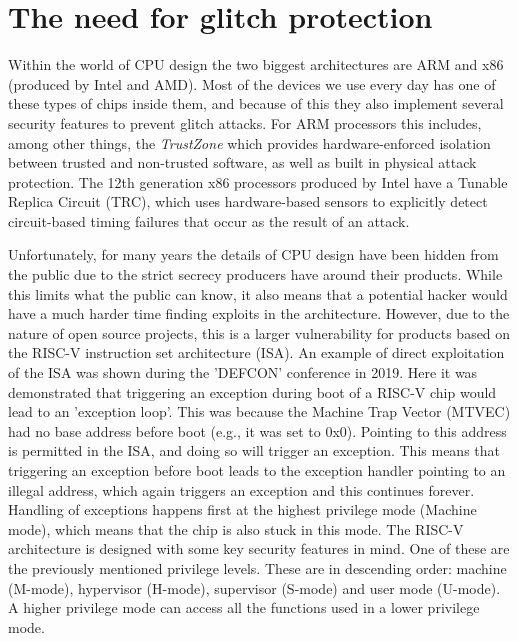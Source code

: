 
\section{The need for glitch protection}

Within the world of CPU design the two biggest architectures are ARM and x86 (produced by Intel and AMD). Most of the devices we use every day has one of these types of chips inside them, and because of this they also implement several security features to prevent glitch attacks. For ARM processors this includes, among other things, the \textit{TrustZone} which provides hardware-enforced isolation between trusted and non-trusted software, as well as built in physical attack protection\cite{arm}. The 12th generation x86 processors produced by Intel have a Tunable Replica Circuit (TRC), which uses hardware-based sensors to explicitly detect circuit-based timing failures that occur as the result of an attack\cite{intel}.  

Unfortunately, for many years the details of CPU design have been hidden from the public due to the strict secrecy producers have around their products\cite{riscv_wiki}. While this limits what the public can know, it also means that a potential hacker would have a much harder time finding exploits in the architecture. However, due to the nature of open source projects, this is a larger vulnerability for products based on the RISC-V instruction set architecture (ISA). An example of direct exploitation of the ISA was shown during the 'DEFCON' conference in 2019\cite{isa_exploit}. Here it was demonstrated that triggering an exception during boot of a RISC-V chip would lead to an 'exception loop'. This was because the Machine Trap Vector (MTVEC) had no base address before boot (e.g., it was set to 0x0). Pointing to this address is permitted in the ISA, and doing so will trigger an exception. This means that triggering an exception before boot leads to the exception handler pointing to an illegal address, which again triggers an exception and this continues forever. Handling of exceptions happens first at the highest privilege mode (Machine mode), which means that the chip is also stuck in this mode. The RISC-V architecture is designed with some key security features in mind. One of these are the previously mentioned privilege levels. These are in descending order: machine (M-mode), hypervisor (H-mode), supervisor (S-mode) and user mode (U-mode). A higher privilege mode can access all the functions used in a lower privilege mode\cite{source2}.

